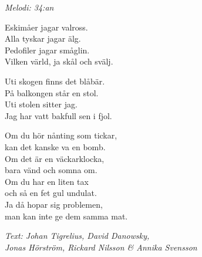 {\footnotesize\textit{Melodi: 34:an}}\par
\vspace{10pt}
Eskimåer jagar valross.\\
Alla tyskar jagar älg.\\
Pedofiler jagar småglin.\\
Vilken värld, ja skål och svälj.\par
\vspace{10pt}
Uti skogen finns det blåbär.\\
På balkongen står en stol.\\
Uti stolen sitter jag.\\
Jag har vatt bakfull sen i fjol.\par
\vspace{10pt}
Om du hör nånting som tickar,\\
kan det kanske va en bomb.\\
Om det är en väckarklocka,\\
bara vänd och somna om.\\
Om du har en liten tax\\
och så en fet gul undulat.\\
\revrpt Ja då hopar sig problemen,\\
man kan inte ge dem samma mat.\rpt\par
\vspace{10pt}
{\footnotesize\textit{Text: Johan Tigrelius, David Danowsky,\\ Jonas Hörström, Rickard Nilsson \& Annika Svensson}}
